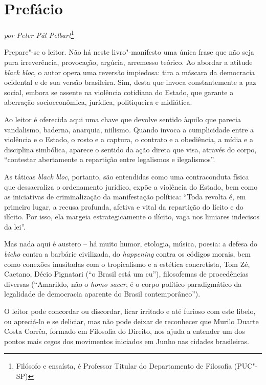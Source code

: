 \chapter{Prefácio}

\begin{flushright}
\emph{por Peter Pál Pelbart}\footnote{Filósofo e ensaísta, é
Professor Titular do Departamento de Filosofia (PUC"-SP)}
\end{flushright}

Prepare"-se o leitor. Não há neste livro"-manifesto uma única frase que
não seja pura irreverência, provocação, argúcia, arremesso teórico. Ao
abordar a atitude \emph{black bloc}, o autor opera uma reversão
impiedosa: tira a máscara da democracia ocidental e de sua versão
brasileira. Sim, desta que invoca constantemente a paz social, embora se
assente na violência cotidiana do Estado, que garante a aberração
socioeconômica, jurídica, politiqueira e midiática.

Ao leitor é oferecida aqui uma chave que devolve sentido àquilo que
parecia vandalismo, baderna, anarquia, niilismo\emph{.} Quando invoca a
cumplicidade entre a violência e o Estado, o rosto e a captura, o
contrato e a obediência, a mídia e a disciplina simbólica, aparece o
sentido da ação direta que visa, através do corpo, ``contestar
abertamente a repartição entre legalismos e ilegalismos''.

As táticas \emph{black bloc}, portanto, são entendidas como uma
contraconduta física que dessacraliza o ordenamento jurídico, expõe a
violência do Estado, bem como as iniciativas de criminalização da
manifestação política: ``Toda revolta é, em primeiro lugar, a recusa
profunda, afetiva e vital da repartição do lícito e do ilícito. Por
isso, ela margeia estrategicamente o ilícito, vaga nos limiares
indecisos da lei''.

Mas nada aqui é austero -- há muito humor, etologia, música, poesia: a
defesa do \emph{bicho} contra a barbárie civilizada, do \emph{happening
}contra os códigos morais, bem como conexões inusitadas com o
tropicalismo e a estética concretista, Tom Zé, Caetano, Décio Pignatari
(``o Brasil está um cu''), filosofemas de procedências diversas
(``Amarildo, não o \emph{homo sacer}, é o corpo político paradigmático
da legalidade de democracia aparente do Brasil contemporâneo'').

O leitor pode concordar ou discordar, ficar irritado e até furioso com
este libelo, ou apreciá-lo e se deliciar, mas não pode deixar de
reconhecer que Murilo Duarte Costa Corrêa, formado em Filosofia do
Direito, nos ajuda a entender um dos pontos mais cegos dos movimentos
iniciados em Junho nas cidades brasileiras.

